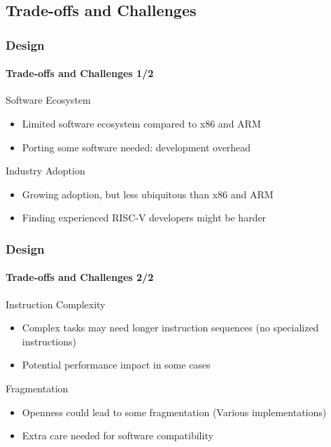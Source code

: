 \documentclass{beamer}
\begin{document}
	\subsection{Trade-offs and Challenges}
	\begin{frame}
		\frametitle{Design}
		\framesubtitle{Trade-offs and Challenges 1/2}
		
		\begin{alertblock}{Software Ecosystem}
			\begin{itemize}
				\item Limited software ecosystem compared to x86 and ARM
				
				\item Porting some software needed: development overhead
			\end{itemize}
		\end{alertblock}
		
		\begin{alertblock}{Industry Adoption}
			\begin{itemize}
				\item Growing adoption, but less ubiquitous than x86 and ARM
				
				\item Finding experienced RISC-V developers might be harder
			\end{itemize}
		\end{alertblock}
	\end{frame}
	
	\begin{frame}
		\frametitle{Design}
		\framesubtitle{Trade-offs and Challenges 2/2}
		
		\begin{alertblock}{Instruction Complexity}
			\begin{itemize}
				\item Complex tasks may need longer instruction sequences (no specialized instructions)
				
				\item Potential performance impact in some cases
			\end{itemize}
		\end{alertblock}
		
		\begin{alertblock}{Fragmentation}
			\begin{itemize}
				\item Openness could lead to some fragmentation (Various implementations)
				
				\item Extra care needed for software compatibility
			\end{itemize}
		\end{alertblock}
	\end{frame}
	
\end{document}

